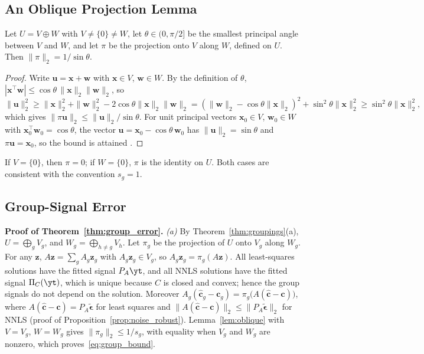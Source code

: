 \subsection{An Oblique Projection Lemma}

\begin{lemma}
\label{lem:oblique}
Let \(U=V\oplus W\) with \(V\ne\{0\}\ne W\), let \(\theta\in(0,\pi/2]\) be the smallest
principal angle between \(V\) and \(W\), and let \(\pi\) be the projection onto
\(V\) along \(W\), defined on \(U\).  Then \(\|\pi\|_2=1/\sin\theta\).
\end{lemma}

\begin{proof}
Write \(\mathbf u=\mathbf x+\mathbf w\) with \(\mathbf x\in V\), \(\mathbf w\in W\).
By the definition of \(\theta\),
\(|\mathbf x^\top\mathbf w|\le\cos\theta\,\|\mathbf x\|_2\|\mathbf w\|_2\), so
\[
\|\mathbf u\|_2^2\ge\|\mathbf x\|_2^2+\|\mathbf w\|_2^2
-2\cos\theta\|\mathbf x\|_2\|\mathbf w\|_2
=(\|\mathbf w\|_2-\cos\theta\|\mathbf x\|_2)^2+\sin^2\theta\|\mathbf x\|_2^2
\ge\sin^2\theta\|\mathbf x\|_2^2 ,
\]
which gives \(\|\pi\mathbf u\|_2\le\|\mathbf u\|_2/\sin\theta\).  For unit principal
vectors \(\mathbf x_0\in V\), \(\mathbf w_0\in W\) with
\(\mathbf x_0^\top\mathbf w_0=\cos\theta\), the vector
\(\mathbf u=\mathbf x_0-\cos\theta\,\mathbf w_0\) has \(\|\mathbf u\|_2=\sin\theta\)
and \(\pi\mathbf u=\mathbf x_0\), so the bound is attained
\citep{ipsen1995angle}.
\end{proof}

If \(V=\{0\}\), then \(\pi=0\); if \(W=\{0\}\), \(\pi\) is the identity on \(U\).  Both
cases are consistent with the convention \(s_g=1\).

\subsection{Group-Signal Error}

\noindent\textbf{Proof of Theorem~\ref{thm:group_error}.}
\emph{(a)}  By Theorem~\ref{thm:groupings}(a), \(U=\bigoplus_{g}V_g\), and
\(W_g=\bigoplus_{h\ne g}V_h\).  Let \(\pi_g\) be the projection of \(U\) onto
\(V_g\) along \(W_g\).  For any \(\mathbf z\),
\(A\mathbf z=\sum_gA_g\mathbf z_g\) with \(A_g\mathbf z_g\in V_g\), so
\(A_g\mathbf z_g=\pi_g(A\mathbf z)\).  All least-squares solutions have the fitted
signal \(P_A\yt\), and all NNLS solutions have the fitted signal \(\Pi_C(\yt)\),
which is unique because \(C\) is closed and convex; hence the group signals do not
depend on the solution.  Moreover
\(A_g(\widehat{\mathbf c}_g-\mathbf c_g)=\pi_g\bigl(A(\widehat{\mathbf c}-\mathbf c)\bigr)\),
where \(A(\widehat{\mathbf c}-\mathbf c)=P_A\widetilde{\boldsymbol\epsilon}\) for
least squares and \(\|A(\widehat{\mathbf c}-\mathbf c)\|_2\le
\|P_A\widetilde{\boldsymbol\epsilon}\|_2\) for NNLS (proof of
Proposition~\ref{prop:noise_robust}).  Lemma~\ref{lem:oblique} with \(V=V_g\),
\(W=W_g\) gives \(\|\pi_g\|_2\le1/s_g\), with equality when \(V_g\) and \(W_g\) are
nonzero, which proves~\eqref{eq:group_bound}.

